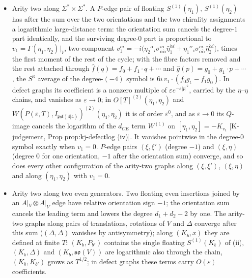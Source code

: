 \begin{theorem}
\begin{itemize}
\item[(iv)] Arity two along $\Sigma^*\times\Sigma^*$. A $P$-edge pair of floating $S^{(1)}(\eta_1)$, $S^{(1)}(\eta_2)$ has after the sum over the two orientations and the two chirality assignments a logarithmic large-distance term: the orientation sum cancels the degree-$1$ part identically, and the surviving degree-$0$ part is proportional to $v_1=\Gamma(\eta_1,\eta_2)|_V$, two-component $v_1^m=-i\big(\eta_2{}^\alpha{}_i\sigma^m_{\alpha\dot\alpha}\bar\eta_1^{\dot\alpha i}+\eta_1{}^\alpha{}_i\sigma^m_{\alpha\dot\alpha}\bar\eta_2^{\dot\alpha i}\big)$, times the first moment of the rest of the cycle; with the fibre factors removed and the rest attached through $\hat f(q)=f_0+f_1\cdot q+\cdots$ and $\hat g(p)=g_0+g_1\cdot p+\cdots$, the $S^3$ average of the degree-$(-4)$ symbol is $6i\,v_1\cdot(f_0g_1-f_1g_0)$. In defect graphs its coefficient is a nonzero multiple of $\varepsilon e^{-\varepsilon|p|^2}$, carried by the $\eta$--$\eta$ chains, and vanishes as $\varepsilon\to0$; in $O[T]^{(2)}(\eta_1,\eta_2)$ and $W(P(\varepsilon,T),I_{\mathfrak{psl}(4|4)})^{(2)}(\eta_1,\eta_2)$ it is of order $\varepsilon^0$, and as $\varepsilon\to0$ its $Q$-image cancels the logarithm of the $d_{CE}$ term $W^{(1)}$ on $[\eta_1,\eta_2]=-K_{v_1}$ [K-judgement, Prop prop:kj-defectlog (iv)]. It vanishes pointwise in the degree-$0$ symbol exactly when $v_1=0$. $P$-edge pairs $(\xi,\xi')$ (degree $-1$) and $(\xi,\eta)$ (degree $0$ for one orientation, $-1$ after the orientation sum) converge, and so does every other configuration of the arity-two graphs along $(\xi,\xi')$, $(\xi,\eta)$ and along $(\eta_1,\eta_2)$ with $v_1=0$.
\item[(v)] Arity two along two even generators. Two floating even insertions joined by an $A|_V\otimes A|_V$ edge have relative orientation sign $-1$; the orientation sum cancels the leading term and lowers the degree $d_1+d_2-2$ by one. The arity-two graphs along pairs of translations, rotations of $V$ and $\Delta$ converge after this sum ($(\Delta,\Delta)$ vanishes by antisymmetry); along $(K_b,x)$ they are defined at finite $T$: $(K_b,P_{b'})$ contains the single floating $S^{(1)}(K_b)$ of (ii), $(K_b,\Delta)$ and $(K_b,\mathfrak{so}(V))$ are logarithmic also through the chain, $(K_b,K_{b'})$ grows as $T^{1/2}$; in defect graphs these terms carry $O(\varepsilon)$ coefficients.
\end{itemize}
\end{theorem}

